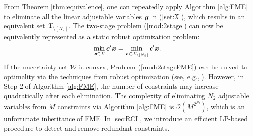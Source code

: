 \documentclass[fleqn,isre,blindrev]{informs4}
\newcommand{\mb}[1]{\mbox{\boldmath \ensuremath{#1}}}
\begin{document}
	
	From Theorem \ref{thm:equivalence}, one can repeatedly apply Algorithm \ref{alg:FME} to eliminate all the linear adjustable variables $\mb{y}$ in (\ref{set:X}), which results in an equivalent set $\mathcal{X}_{\setminus [N_2]}$. The two-stage  problem (\ref{mod:2stage}) can now be equivalently represented as a static robust optimization problem:
\begin{equation}
		\label{mod:2stageFME}
		\min_{\boldsymbol{x} \in \mathcal{X}} \mb{c}'\mb{x} = \min_{\boldsymbol{x} \in \mathcal{X}_{\setminus [N_2]}} \mb{c}'\mb{x}.
\end{equation}
	If the uncertainty set $\mathcal{W}$ is convex,  Problem (\ref{mod:2stageFME}) can be solved to optimality via the techniques from robust optimization (see, e.g., \cite{mb09,bdv15,gbbd14}).  However, in Step 2 of Algorithm \ref{alg:FME}, the number of constraints may increase quadratically after each elimination. The complexity of eliminating $N_2$ adjustable variables from $M$ constraints via Algorithm \ref{alg:FME} is $\mathcal{O}(M^{2^{N_2}})$, which is an unfortunate inheritance of FME. In \textsection \ref{sec:RCI}, we introduce an efficient LP-based procedure to detect and remove redundant constraints.
	
\end{document}
